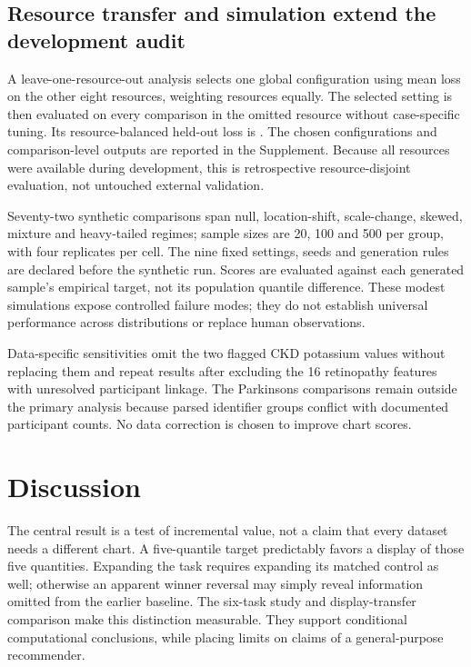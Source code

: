 \documentclass[11pt]{article}
\begin{document}
\subsection*{Resource transfer and simulation extend the development audit}
A leave-one-resource-out analysis selects one global configuration using mean loss on the other eight resources, weighting resources equally. The selected setting is then evaluated on every comparison in the omitted resource without case-specific tuning. Its resource-balanced held-out loss is \TransferLoss{}. The chosen configurations and comparison-level outputs are reported in the Supplement. Because all resources were available during development, this is retrospective resource-disjoint evaluation, not untouched external validation.

Seventy-two synthetic comparisons span null, location-shift, scale-change, skewed, mixture and heavy-tailed regimes; sample sizes are 20, 100 and 500 per group, with four replicates per cell. The nine fixed settings, seeds and generation rules are declared before the synthetic run. Scores are evaluated against each generated sample's empirical target, not its population quantile difference. These modest simulations expose controlled failure modes; they do not establish universal performance across distributions or replace human observations.

Data-specific sensitivities omit the two flagged CKD potassium values without replacing them and repeat results after excluding the 16 retinopathy features with unresolved participant linkage. The Parkinsons comparisons remain outside the primary analysis because parsed identifier groups conflict with documented participant counts. No data correction is chosen to improve chart scores.

\section*{Discussion}
The central result is a test of incremental value, not a claim that every dataset needs a different chart. A five-quantile target predictably favors a display of those five quantities. Expanding the task requires expanding its matched control as well; otherwise an apparent winner reversal may simply reveal information omitted from the earlier baseline. The six-task study and display-transfer comparison make this distinction measurable. They support conditional computational conclusions, while placing limits on claims of a general-purpose recommender.
\end{document}
